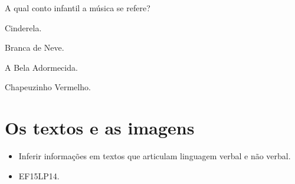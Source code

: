 
A qual conto infantil a música se refere?

\begin{escolha}
\item Cinderela.

\item Branca de Neve.

\item A Bela Adormecida.

\item Chapeuzinho Vermelho.
\end{escolha}


\chapter{Os textos e as imagens}


\begin{itemize}
\item
Inferir informações em textos que articulam linguagem verbal e não verbal.
\end{itemize}


\begin{itemize}
\item EF15LP14.
\end{itemize}


